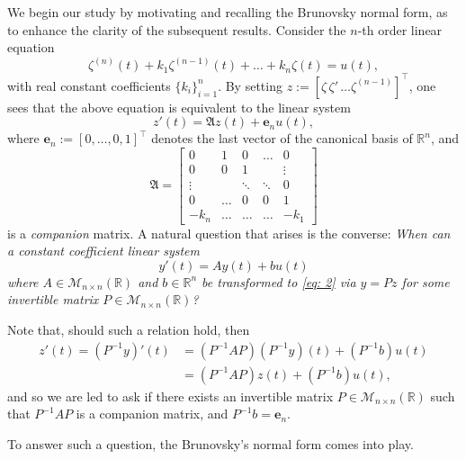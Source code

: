 \documentclass[journal,twoside,web]{ieeecolor}
\newcommand{\R}{\mathbb{R}}
\begin{document}
	We begin our study by motivating and recalling the Brunovsky normal form, as to enhance the clarity of the subsequent results. Consider the $n$-th order linear equation
	\begin{equation}
	\zeta^{(n)}(t) + k_1\zeta^{(n-1)}(t) + \ldots + k_n \zeta(t) = u(t),
	\end{equation}
	with real constant coefficients $\{k_i\}_{i=1}^n$. 
	By setting $z:= \left[\zeta \, \zeta' \, \ldots \zeta^{(n-1)}\right]^\top$, one sees that the above equation is equivalent to the linear system
	\begin{equation} \label{eq: 2}
	z'(t) = \mathfrak{A} z(t) + \mathbf{e}_n u(t),
	\end{equation}
	where $\mathbf{e}_n := [0, \ldots, 0, 1]^\top$ denotes the last vector of the canonical basis of $\R^n$, and
	\begin{equation}
	\mathfrak{A} = \begin{bmatrix} 0& 1& 0& \ldots& 0 \\ 
						     0& 0& 1& & \vdots \\
						     \vdots&  &\ddots& \ddots& 0 \\
						     0& \ldots& 0 & 0 & 1 \\
						     -k_n& \hdots &\hdots &\hdots & -k_1 
				\end{bmatrix}
	\end{equation}
	is a \emph{companion} matrix.
	A natural question that arises is the converse: \emph{When can a constant coefficient linear system 
	\begin{equation}
	y'(t) = Ay(t) + bu(t)
	\end{equation}
	where $A\in \mathcal{M}_{n\times n}(\R)$ and $b\in\R^n$ be transformed to \eqref{eq: 2} via $y=Pz$ for some invertible matrix $P\in\mathcal{M}_{n\times n}(\R)$?} 
	
	Note that, should such a relation hold, then
	\begin{align*}
	z'(t) = \left(P^{-1}y\right)'(t) &= \left(P^{-1}AP\right)\left(P^{-1}y\right)(t) + \left(P^{-1}b\right)u(t)\\
				   &= \left(P^{-1}AP\right)z(t) + \left(P^{-1}b\right)u(t), 
	\end{align*}
	and so we are led to ask if there exists an invertible matrix $P\in\mathcal{M}_{n\times n}(\R)$ such that $P^{-1}AP$ is a companion matrix, and $P^{-1}b=\mathbf{e}_n$.
		
		
	To answer such a question, the Brunovsky's normal form comes into play.
	\medskip
	
\end{document}

